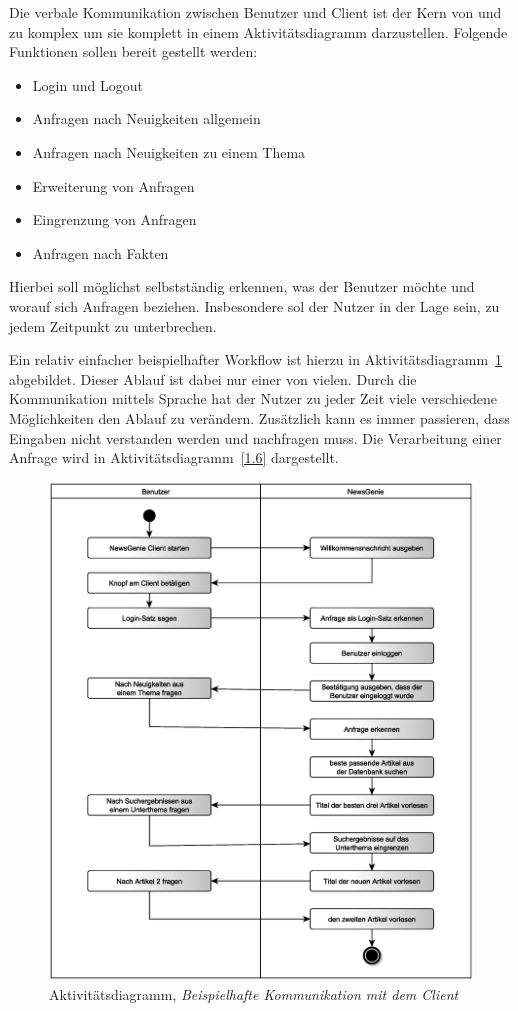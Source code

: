 Die verbale Kommunikation zwischen Benutzer und Client ist der Kern von \NewsGenie 
und zu komplex um sie komplett in einem Aktivitätsdiagramm darzustellen.
Folgende Funktionen sollen bereit gestellt werden:
\begin{itemize}
\item Login und Logout
\item Anfragen nach Neuigkeiten allgemein
\item Anfragen nach Neuigkeiten zu einem Thema
\item Erweiterung von Anfragen
\item Eingrenzung von Anfragen
\item Anfragen nach Fakten
\end{itemize}
Hierbei soll \NewsGenie möglichst selbstständig erkennen, was der Benutzer möchte und worauf sich
Anfragen beziehen. Insbesondere sol der Nutzer in der Lage sein, \NewsGenie zu jedem Zeitpunkt zu unterbrechen.

Ein relativ einfacher beispielhafter Workflow ist hierzu in Aktivitätsdiagramm~\ref{1.5} abgebildet.
Dieser Ablauf ist dabei nur einer von vielen. Durch die Kommunikation mittels Sprache hat der Nutzer zu jeder Zeit
viele verschiedene Möglichkeiten den Ablauf zu verändern.
Zusätzlich kann es immer passieren, dass Eingaben nicht verstanden werden und \NewsGenie nachfragen muss.
Die Verarbeitung einer Anfrage wird in Aktivitätsdiagramm~\ref{1.6} dargestellt.

\begin{figure}[h]
\centering
\includegraphics[width=1\textwidth]{Systementwurf/01_einleitung/conversation.eps}
\caption{Aktivitätsdiagramm, \textit{Beispielhafte Kommunikation mit dem Client}
\label{1.5}}
\end{figure}

